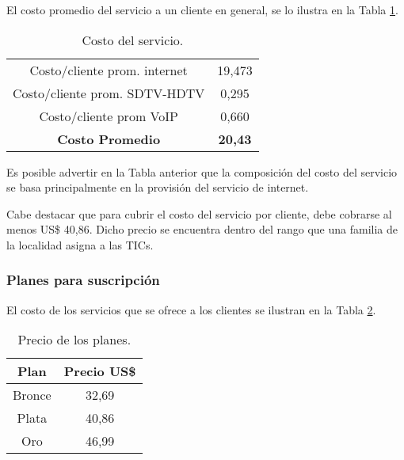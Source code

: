 \begin{itemize}
El costo promedio del servicio a un cliente en general, se lo ilustra en la Tabla \ref{tab:costo-servicio}.


\begin{table}[H]
  \centering
    \begin{tabular}{|c|c|}
    \hline
    \rowcolor[rgb]{ .773,  .851,  .945} \multicolumn{2}{|c|}{\textbf{Costo Promedio del Servicio en US\$}} \bigstrut\\
    \hline
    Costo/cliente prom. internet & 19,473 \bigstrut\\
    \hline
    Costo/cliente prom. SDTV-HDTV & 0,295 \bigstrut\\
    \hline
    Costo/cliente prom VoIP & 0,660 \bigstrut\\
    \hline
    \rowcolor[rgb]{ .773,  .851,  .945} \textbf{Costo Promedio} & \textbf{20,43} \bigstrut\\
    \hline
    \end{tabular}%
	\caption{Costo del servicio.}
  \label{tab:costo-servicio}%
\end{table}%


Es posible advertir en la Tabla anterior que la composición del costo del servicio
se basa principalmente en la provisión del servicio de internet.

Cabe destacar que para cubrir el costo del servicio por cliente, debe cobrarse al menos US\$ 40,86.
Dicho precio se encuentra dentro del rango que una familia de la localidad asigna a las TICs.

\subsubsection{Planes para suscripción}
El costo de los servicios que se ofrece a los clientes se ilustran en la Tabla \ref{tab:precio-planes}.


\begin{table}[H]
  \centering
    \begin{tabular}{|c|c|}
    \hline
    \rowcolor[rgb]{ .773,  .851,  .945} \textbf{Plan} & \textbf{Precio US\$} \bigstrut\\
    \hline
    Bronce & 32,69 \bigstrut\\
    \hline
    Plata & 40,86 \bigstrut\\
    \hline
    Oro   & 46,99 \bigstrut\\
    \hline
    \end{tabular}%
    \caption{Precio de los planes.}
  \label{tab:precio-planes}%
\end{table}%



\end{itemize}
